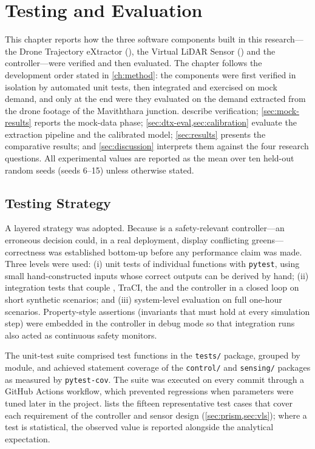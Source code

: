 \chapter{Testing and Evaluation}\label{ch:eval}

This chapter reports how the three software components built in this research---the Drone Trajectory eXtractor (\dtx{}), the Virtual LiDAR Sensor (\vls{}) and the \prism{} controller---were verified and then evaluated. The chapter follows the development order stated in \cref{ch:method}: the components were first verified in isolation by automated unit tests, then integrated and exercised on mock demand, and only at the end were they evaluated on the demand extracted from the drone footage of the Maviththara junction.  describe verification; \cref{sec:mock-results} reports the mock-data phase; \cref{sec:dtx-eval,sec:calibration} evaluate the extraction pipeline and the calibrated \sumo{} model; \cref{sec:results} presents the comparative results; and \cref{sec:discussion} interprets them against the four research questions. All experimental values are reported as the mean over ten held-out random seeds (seeds 6--15) unless otherwise stated.

\section{Testing Strategy}\label{sec:testing-strategy}

A layered strategy was adopted. Because \prism{} is a safety-relevant controller---an erroneous decision could, in a real deployment, display conflicting greens---correctness was established bottom-up before any performance claim was made. Three levels were used: (i) unit tests of individual functions with \texttt{pytest}, using small hand-constructed inputs whose correct outputs can be derived by hand; (ii) integration tests that couple \sumo{}, TraCI, the \vls{} and the controller in a closed loop on short synthetic scenarios; and (iii) system-level evaluation on full one-hour scenarios. Property-style assertions (invariants that must hold at every simulation step) were embedded in the controller in debug mode so that integration runs also acted as continuous safety monitors.

The unit-test suite comprised  test functions in the \texttt{tests/} package, grouped by module, and achieved  statement coverage of the \texttt{control/} and \texttt{sensing/} packages as measured by \texttt{pytest-cov}. The suite was executed on every commit through a GitHub Actions workflow, which prevented regressions when parameters were tuned later in the project.  lists the fifteen representative test cases that cover each requirement of the controller and sensor design (\cref{sec:prism,sec:vls}); where a test is statistical, the observed value is reported alongside the analytical expectation.

